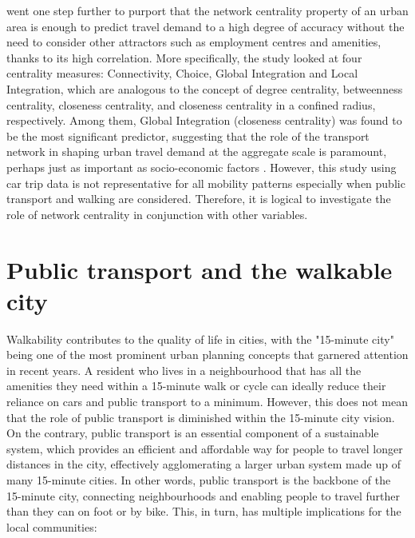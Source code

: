 \citet{jayasingheApplicationDevelopingCountries2017} went one step further to purport that the network centrality property of an urban area is enough to predict travel demand to a high degree of accuracy without the need to consider other attractors such as employment centres and amenities, thanks to its high correlation. More specifically, the study looked at four centrality measures: Connectivity, Choice, Global Integration and Local Integration, which are analogous to the concept of degree centrality, betweenness centrality, closeness centrality, and closeness centrality in a confined radius, respectively. Among them, Global Integration (closeness centrality) was found to be the most significant predictor, suggesting that the role of the transport network in shaping urban travel demand at the aggregate scale is paramount, perhaps just as important as socio-economic factors \citep{converyDeterminantsTransportMode2019}. However, this study using car trip data is not representative for all mobility patterns especially when public transport and walking are considered. Therefore, it is logical to investigate the role of network centrality in conjunction with other variables.

\section{Public transport and the walkable city}

Walkability contributes to the quality of life in cities, with the "15-minute city" being one of the most prominent urban planning concepts that garnered attention in recent years. A resident who lives in a neighbourhood that has all the amenities they need within a 15-minute walk or cycle can ideally reduce their reliance on cars and public transport to a minimum. However, this does not mean that the role of public transport is diminished within the 15-minute city vision. On the contrary, public transport is an essential component of a sustainable system, which provides an efficient and affordable way for people to travel longer distances in the city, effectively agglomerating a larger urban system made up of many 15-minute cities. In other words, public transport is the backbone of the 15-minute city, connecting neighbourhoods and enabling people to travel further than they can on foot or by bike. This, in turn, has multiple implications for the local communities:

